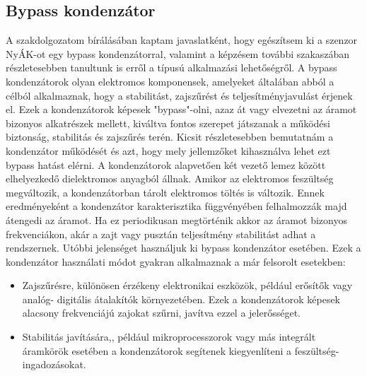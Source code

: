 \subsection{Bypass kondenzátor}
A szakdolgozatom bírálásában kaptam javaslatként, hogy egészítsem ki a szenzor NyÁK-ot egy bypass kondenzátorral, valamint a képzésem további szakaszában részletesebben tanultunk is erről a típusú alkalmazási lehetőségről. A bypass kondenzátorok olyan elektromos komponensek, amelyeket általában abból a célból alkalmaznak, hogy a stabilitást, zajszűrést és teljesítményjavulást érjenek el. Ezek a kondenzátorok képesek "bypass"-olni, azaz át vagy elvezetni az áramot bizonyos alkatrészek mellett, kiváltva fontos szerepet játszanak a működési biztonság, stabilitás és zajszűrés terén. Kicsit részletesebben bemutatnám a kondenzátor működését és azt, hogy mely jellemzőket kihasználva lehet ezt bypass hatást elérni. A kondenzátorok alapvetően két vezető lemez között elhelyezkedő dielektromos anyagból állnak. Amikor az elektromos feszültség megváltozik, a kondenzátorban tárolt elektromos töltés is változik. Ennek eredményeként a kondenzátor karakterisztika függvényében felhalmozzák majd átengedi az áramot. Ha ez periodikusan megtörténik akkor az áramot bizonyos frekvenciákon, akár a zajt vagy pusztán teljesítmény stabilitást adhat a rendszernek. Utóbbi jelenséget használjuk ki bypass kondenzátor esetében. Ezek a kondenzátor használati módot gyakran alkalmaznak a már felsorolt esetekben:
\begin{itemize}
	\item Zajszűrésre, különösen érzékeny elektronikai eszközök, például erősítők vagy analóg- digitális átalakítók környezetében. Ezek a kondenzátorok képesek alacsony frekvenciájú zajokat szűrni, javítva ezzel a jelerősséget.
	\item Stabilitás javítására,, például mikroprocesszorok vagy más integrált áramkörök esetében a kondenzátorok segítenek kiegyenlíteni a feszültség-ingadozásokat.
\end{itemize}



